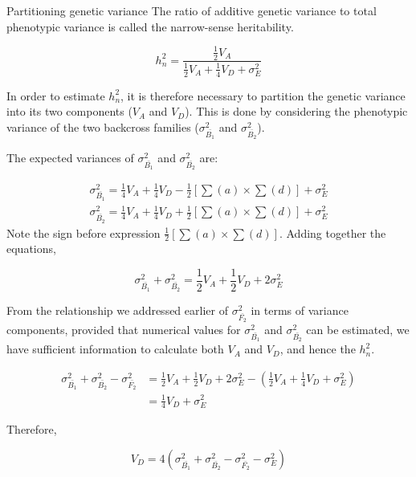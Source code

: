 \documentclass[11pt,dvipsnames,ignorenonframetext,aspectratio=169]{beamer}
\begin{document}
\begin{frame}{Partitioning genetic variance}
\protect\hypertarget{partitioning-genetic-variance}{}
The ratio of additive genetic variance to total phenotypic variance is
called the narrow-sense heritability.

\[
h_n^2 = \frac{\frac{1}{2}V_A}{\frac{1}{2}V_A + \frac{1}{4}V_D + \sigma_E^2}
\tag{v}
\]

In order to estimate \(h_n^2\), it is therefore necessary to partition
the genetic variance into its two components (\(V_A\) and \(V_D\)). This
is done by considering the phenotypic variance of the two backcross
families (\(\sigma_{\bar{B_1}}^2\) and \(\sigma_{\bar{B_2}}^2\)).
\end{frame}

\begin{frame}{}
\protect\hypertarget{section-19}{}
The expected variances of \(\sigma_{\bar{B_1}}^2\) and
\(\sigma_{\bar{B_2}}^2\) are:

\[
\begin{aligned}
\sigma_{\bar{B_1}}^2 = \frac{1}{4}V_A + \frac{1}{4}V_D - \frac{1}{2}\left[\sum(a)\times\sum(d)\right] + \sigma_E^2 \\
\sigma_{\bar{B_2}}^2 = \frac{1}{4}V_A + \frac{1}{4}V_D + \frac{1}{2}\left[\sum(a)\times\sum(d)\right] + \sigma_E^2
\end{aligned}
\] Note the sign before expression
\(\frac{1}{2}\left[\sum(a)\times\sum(d)\right]\). Adding together the
equations,

\[
\sigma_{\bar{B_1}}^2 + \sigma_{\bar{B_2}}^2 = \frac{1}{2}V_A + \frac{1}{2}V_D + 2\sigma_E^2
\tag{vi}
\]
\end{frame}

\begin{frame}{}
\protect\hypertarget{section-20}{}
From the relationship we addressed earlier of \(\sigma_{\bar{F_2}}^2\)
in terms of variance components, provided that numerical values for
\(\sigma_{\bar{B_1}}^2\) and \(\sigma_{\bar{B_2}}^2\) can be estimated,
we have sufficient information to calculate both \(V_A\) and \(V_D\),
and hence the \(h_n^2\).

\[
\begin{aligned}
\sigma_{\bar{B_1}}^2 + \sigma_{\bar{B_2}}^2 - \sigma_{\bar{F_2}}^2 &= \frac{1}{2}V_A + \frac{1}{2}V_D + 2\sigma_E^2 - \left(\frac{1}{2}V_A + \frac{1}{4}V_D + \sigma_E^2\right) \\
&= \frac{1}{4}V_D + \sigma_E^2
\end{aligned}
\]

Therefore,

\[
V_D = 4\left(\sigma_{\bar{B_1}}^2 + \sigma_{\bar{B_2}}^2 - \sigma_{\bar{F_2}}^2 - \sigma_E^2 \right)
\tag{vii}
\]
\end{frame}
\end{document}
